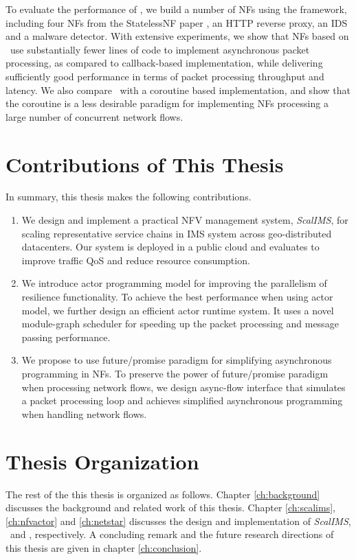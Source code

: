 To evaluate the performance of \netstar, we build a number of NFs using the framework, including four NFs from the StatelessNF paper \cite{201545}, an HTTP reverse proxy, an IDS and a malware detector. %
With extensive experiments, we show that NFs based on \netstar~use substantially fewer lines of code to implement asynchronous packet processing, as compared to callback-based implementation, while delivering sufficiently good performance in terms of packet processing throughput and latency. We also compare \netstar~with a coroutine based implementation, and show that the coroutine is a less desirable paradigm for implementing NFs processing a large number of concurrent network flows.

\section{Contributions of This Thesis}

In summary, this thesis makes the following contributions.

\begin{enumerate}
\item We design and implement a practical NFV management system, \textit{ScalIMS}, for scaling representative service chains in IMS system across geo-distributed datacenters. Our system is deployed in a public cloud and evaluates to improve traffic QoS and reduce resource consumption.
\item We introduce actor programming model for improving the parallelism of resilience functionality. To achieve the best performance when using actor model, we further design an efficient actor runtime system. It uses a novel module-graph scheduler for speeding up the packet processing and message passing performance.
\item We propose to use future/promise paradigm for simplifying asynchronous programming in NFs. To preserve the power of future/promise paradigm when processing network flows, we design async-flow interface that simulates a packet processing loop and achieves simplified asynchronous programming when handling network flows.
\end{enumerate}

\section{Thesis Organization}

The rest of the this thesis is organized as follows. Chapter \ref{ch:background} discusses the background and related work of this thesis. Chapter \ref{ch:scalims}, \ref{ch:nfvactor} and \ref{ch:netstar} discusses the design and implementation of \textit{ScalIMS}, \nfactor~and \netstar, respectively. A concluding remark and the future research directions of this thesis are given in chapter \ref{ch:conclusion}.
